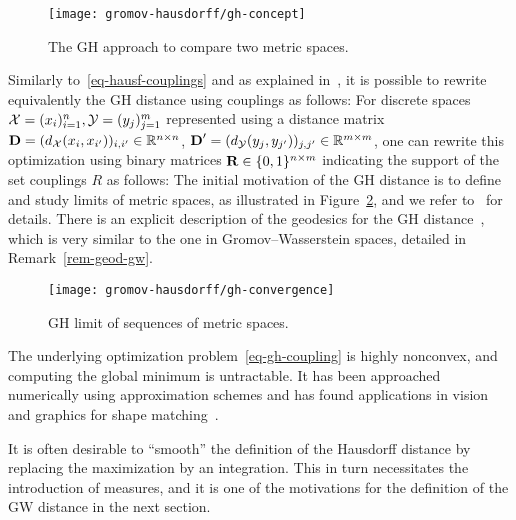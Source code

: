\begin{figure}[h!]
\centering
\texttt{[image: gromov-hausdorff/gh-concept]}
\caption{\label{fig-gh}
The GH approach to compare two metric spaces.
}
\end{figure}

Similarly to~\eqref{eq-hausf-couplings} and as explained in~\citep{memoli-2011}, it is possible to rewrite equivalently the GH distance using couplings as follows:
For discrete spaces $\mathcal{X} = (x_i)_{i=1}^n, \mathcal{Y} = (y_j)_{j=1}^m$ represented using a distance matrix $\mathrm{\textbf{D}} = ( d_{\mathcal{X}}(x_i,x_{i'}) )_{i,i'} \in \mathbb{R}^{n \times n}$,  $\mathrm{\textbf{D}}' = ( d_{\mathcal{Y}}(y_j,y_{j'}) )_{j,j'} \in \mathbb{R}^{m \times m}$, one can rewrite this optimization using binary matrices $\mathrm{\textbf{R}} \in \{0,1\}^{n \times m}$ indicating the support of the set couplings $R$ as follows:
The initial motivation of the GH distance is to define and study limits of metric spaces, as illustrated in Figure~\ref{fig-gh-limit}, and we refer to~\citep{burago2001course} for details. 
%
There is an explicit description of the geodesics for the GH distance~\citep{chowdhury2016constructing}, which is very similar to the one in Gromov--Wasserstein spaces, detailed in Remark~\ref{rem-geod-gw}. 

\begin{figure}[h!]
\centering
\texttt{[image: gromov-hausdorff/gh-convergence]}
\caption{\label{fig-gh-limit}
GH limit of sequences of metric spaces.  
}
\end{figure}

The underlying optimization problem~\eqref{eq-gh-coupling} is highly nonconvex, and computing the global minimum is untractable. It has been approached numerically using approximation schemes and has found applications in vision and graphics for shape matching~\citep{memoli2005theoretical,bronstein2006generalized}.

It is often desirable to ``smooth'' the definition of the Hausdorff distance by replacing the maximization by an integration. This in turn necessitates the introduction of measures, and it is one of the motivations for the definition of the GW distance in the next section.
 
